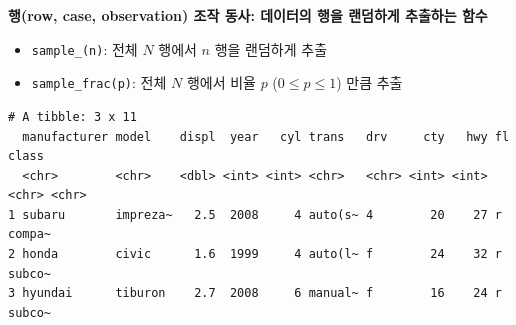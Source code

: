 \documentclass[
  11pt,
]{krantz}
\makeatletter
\newenvironment{Shaded}{\begin{snugshade}}{\end{snugshade}}
\newcommand{\CommentTok}[1]{\textcolor[rgb]{0.37,0.37,0.37}{\textit{#1}}}
\newcommand{\DecValTok}[1]{\textcolor[rgb]{0.06,0.06,0.06}{#1}}
\newcommand{\FloatTok}[1]{\textcolor[rgb]{0.06,0.06,0.06}{#1}}
\newcommand{\KeywordTok}[1]{\textcolor[rgb]{0.27,0.27,0.27}{\textbf{#1}}}
\newcommand{\NormalTok}[1]{#1}
\newcommand{\OperatorTok}[1]{\textcolor[rgb]{0.43,0.43,0.43}{\textbf{#1}}}
\newcommand{\StringTok}[1]{\textcolor[rgb]{0.5,0.5,0.5}{#1}}
\providecommand{\tightlist}{%
  \setlength{\itemsep}{0pt}\setlength{\parskip}{0pt}}
\newenvironment{kframe}{%
\medskip{}
\setlength{\fboxsep}{.8em}
 \def\at@end@of@kframe{}%
 \ifinner\ifhmode%
  \def\at@end@of@kframe{\end{minipage}}%
  \begin{minipage}{\columnwidth}%
 \fi\fi%
 \def\FrameCommand##1{\hskip\@totalleftmargin \hskip-\fboxsep
 \colorbox{shadecolor}{##1}\hskip-\fboxsep
     \hskip-\linewidth \hskip-\@totalleftmargin \hskip\columnwidth}%
 \MakeFramed {\advance\hsize-\width
   \@totalleftmargin\z@ \linewidth\hsize
   \@setminipage}}%
 {\par\unskip\endMakeFramed%
 \at@end@of@kframe}
\renewenvironment{quote}{\begin{kframe}}{\end{kframe}}
\makeatother
\begin{document}
\begin{quote}
\textbf{행(row, case, observation) 조작 동사: 데이터의 행을 랜덤하게 추출하는 함수}
\end{quote}

\begin{itemize}
\tightlist
\item
  \texttt{sample\_(n)}: 전체 \(N\) 행에서 \(n\) 행을 랜덤하게 추출
\item
  \texttt{sample\_frac(p)}: 전체 \(N\) 행에서 비율 \(p\) (\(0\leq p \leq1\)) 만큼 추출
\end{itemize}

\footnotesize

\begin{Shaded}
\end{Shaded}

\begin{verbatim}
# A tibble: 3 x 11
  manufacturer model    displ  year   cyl trans   drv     cty   hwy fl    class 
  <chr>        <chr>    <dbl> <int> <int> <chr>   <chr> <int> <int> <chr> <chr> 
1 subaru       impreza~   2.5  2008     4 auto(s~ 4        20    27 r     compa~
2 honda        civic      1.6  1999     4 auto(l~ f        24    32 r     subco~
3 hyundai      tiburon    2.7  2008     6 manual~ f        16    24 r     subco~
\end{verbatim}

\begin{Shaded}
\end{Shaded}
\end{document}
